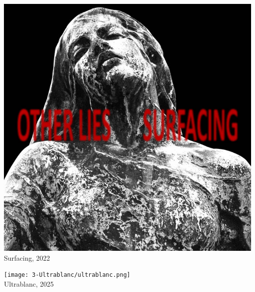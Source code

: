 \begin{titlepage}
\begin{center}
\begin{minipage}[t]{0.33\textwidth}
    \includegraphics[width=0.98\linewidth]{2-Surfacing/surfacing.jpg}\\
    {\Large \sffamily Surfacing, 2022}
  \end{minipage}%
  \begin{minipage}[t]{0.33\textwidth}
    \centering
    \texttt{[image: 3-Ultrablanc/ultrablanc.png]}\\
    {\Large \sffamily Ultrablanc, 2025}
  \end{minipage}%
 \end{center}
\end{titlepage}

